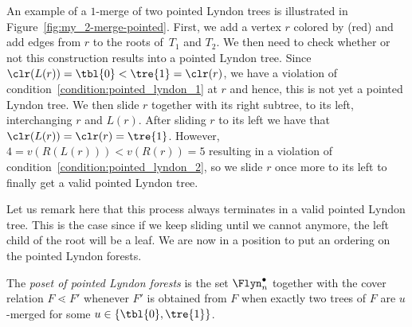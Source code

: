   An example of a $1$-merge of two pointed Lyndon trees is illustrated in Figure~\ref{fig:my_2-merge-pointed}. First,  we add a vertex $r$ colored by  (red) and add edges from $r$ to the roots of~$T_1$ and $T_2$.  We then need to check whether or not this construction results into a pointed Lyndon tree. Since $\clr(L(r))=\tbl{0}<\tre{1}=\clr(r)$, we  have a violation of condition~\eqref{condition:pointed_lyndon_1} at $r$ and hence, this is not yet a pointed Lyndon tree. We then slide $r$ together with its right subtree, to its left, interchanging $r$ and $L(r)$. After sliding $r$ to its left we have that $\clr(L(r))=\clr(r)=\tre{1}$. However,  $4=v(R(L(r)))<v(R(r))=5$ resulting in a violation of condition~\eqref{condition:pointed_lyndon_2}, so we slide $r$ once more to its left to finally get a valid pointed Lyndon tree.
 
Let us remark here that this process always terminates in  a valid pointed Lyndon tree.  This is the case since if we keep sliding until we cannot anymore, the left child of the root will be a leaf. We are  now in a position to put an ordering on the pointed Lyndon forests.

 \begin{defi}   The \emph{poset of pointed Lyndon forests} is the set $\Flyn_{n}^{\bullet}$ together with the  cover relation $F\lessdot F'$   whenever $F'$ is obtained from $F$ when exactly two trees of $F$ are $u$-merged for some $u\in\left\{\tbl{0},\tre{1}\right\}$.
\end{defi}


